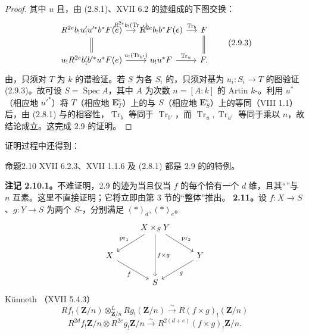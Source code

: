\begin{proof}
其中 $u$ 且，由 (2.8.1)、XVII 6.2 的迹组成的下图交换：
\[\begin{tikzcd}[column sep=small]
R^{2e}b_!u'_!u'^*b^*F(e)\arrow[r,"R^{2e}b_!(\operatorname{Tr}_{u'})"]\arrow[d,equal]&R^{2e}b_!b^*F(e)\arrow[r,"\operatorname{Tr}_b"]&F\arrow[d,equal]\\
u_!R^{2e}b'_!b'^*u^*F(e)\arrow[r,"u_!(\operatorname{Tr}_{b'})"]&u_!u^*F\arrow[r,"\operatorname{Tr}_u"]&F.
\end{tikzcd}\tag{2.9.3}\]
由，只须对 $T$ 为 $k$ 的谱验证。若 $S$ 为各 $S_i$ 的，只须对基为 $u_i:S_i\to T$ 的图验证 (2.9.3)。故可设 $S=\operatorname{Spec}A$，其中 $A$ 为次数 $n=[A:k]$ 的 Artin  $k$-。利用 $u^*$（相应地 $u'^*$）将 $T$（相应地 $\mathbf E^e_T$）上的与 $S$（相应地 $\mathbf E^e_S$）上的等同（VIII 1.1）后，由 (2.8.1) 与的相容性，$\operatorname{Tr}_b$ 等同于 $\operatorname{Tr}_{b'}$，而 $\operatorname{Tr}_u,\operatorname{Tr}_{u'}$ 等同于乘以 $n$，故结论成立。这完成 2.9 的证明。
\end{proof}
证明过程中还得到：
\begin{SGAresult}{命题}{2.10}
 XVII 6.2.3、XVII 1.1.6 及 (2.8.1) 都是 2.9 的的特例。
\end{SGAresult}
\textbf{注记 2.10.1。}不难证明，2.9 的迹为当且仅当 $f$ 的每个恰有一个 $d$ 维，且其“”与 $n$ 互素。这里不直接证明；它将立即由第 3 节的“整体”推出。
\textbf{2.11。}设 $f:X\to S$、$g:Y\to S$ 为两个 $S$-，分别满足 $(*)_d,(*)_e$。
\[\begin{tikzcd}&X\times_SY\arrow[dl,"\operatorname{pr}_1"']\arrow[dr,"\operatorname{pr}_2"]\arrow[dd,"f\times g"]&\\X\arrow[dr,"f"']&&Y\arrow[dl,"g"]\\&S&\end{tikzcd}\]
Künneth （XVII 5.4.3）
\[Rf_!(\mathbf Z/n)\mathbin{\otimes^L_{\mathbf Z/n}}Rg_!(\mathbf Z/n)\xrightarrow\sim R(f\times g)_!(\mathbf Z/n)\]
\[R^{2d}f_!\mathbf Z/n\otimes R^{2e}g_!\mathbf Z/n\xrightarrow\sim R^{2(d+e)}(f\times g)_!\mathbf Z/n.\tag{2.11.1}\]
